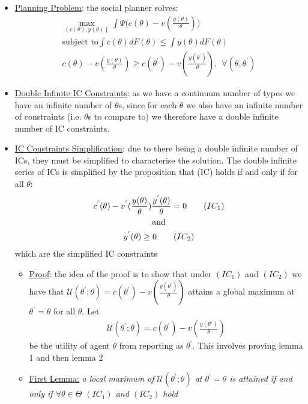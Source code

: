 \documentclass{article}
\begin{document}
\begin{itemize}
    \item \underline{Planning Problem}: the social planner solves:
    \begin{gather*}
        \max_{\left\{ c(\theta), y(\theta) \right\}} \int \Psi  \big( c(\theta) - v(\frac{y(\theta)}{\theta}) \big) \\
        \text{subject to}
        \int c(\theta) d F(\theta) \leq \int y(\theta) d F(\theta) \tag{RC} \\
        c(\theta) - v(\frac{y(\theta)}{\theta}) \geq c(\theta^{'}) - v (\frac{y(\theta^{'})}{\theta}), \ \ \forall (\theta, \theta^{'}) \tag{IC}
    \end{gather*}
    \item  \underline{Double Infinite IC Constraints}: as we have a continuum number of types we have an infinite number of $\theta$s, since for each $\theta$ we also have an infinite number of constraints (i.e. $\theta$s to compare to) we therefore have a double infinite number of IC constraints.
    \item  \underline{IC Constraints Simplification}: due to there being a double infinite number of ICs, they must be simplified to characterise the solution. The double infinite series of ICs is simplified by the proposition that (IC) holds if and only if for all $\theta$:
    \begin{gather*}
        c^{'}(\theta) - v^{'}(\frac{y(\theta)}{\theta}) \frac{y^{'}(\theta)}{\theta} = 0 \tag{$IC_{1}$} \\
        \text{and} \\
        y^{'}(\theta) \geq 0 \tag{$IC_{2}$}
    \end{gather*}
    which are the simplified IC constraints
    \begin{itemize}
        \item  \underline{Proof}: the idea of the proof is to show that under $(IC_{1})$ and $(IC_{2})$ we have that $\mathcal{U}(\theta^{'}; \theta) = c(\theta^{'}) - v(\frac{y(\theta^{'})}{\theta})$ attains a global maximum at $\theta^{'} = \theta$ for all $\theta$. Let
        \begin{gather}
            \mathcal{U} (\theta^{'}; \theta) = c(\theta^{'}) - v(\frac{y(\theta')}{\theta})
        \end{gather}
        be the utility of agent $\theta$ from reporting as $\theta^{'}$. This involves proving lemma 1 and then lemma 2
        \item \underline{First Lemma:} \textit{a local maximum of $\mathcal{U}(\theta^{'}; \theta)$ at $\theta^{'} = \theta$ is attained if and only if $\forall \theta \in \Theta$ $(IC_{1})$ and $(IC_{2})$ hold}

\end{itemize}
\end{itemize}
\end{document}
